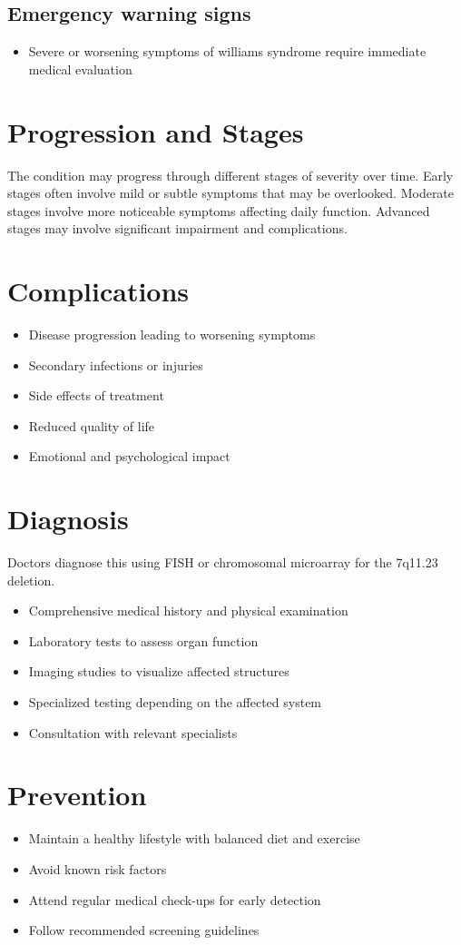 \subsection{Emergency warning signs}
\begin{itemize}[noitemsep]
  \item Severe or worsening symptoms of williams syndrome require immediate medical evaluation
\end{itemize}
\section{Progression and Stages}
The condition may progress through different stages of severity over time. Early stages often involve mild or subtle symptoms that may be overlooked. Moderate stages involve more noticeable symptoms affecting daily function. Advanced stages may involve significant impairment and complications.
\section{Complications}
\begin{itemize}[noitemsep]
  \item Disease progression leading to worsening symptoms
  \item Secondary infections or injuries
  \item Side effects of treatment
  \item Reduced quality of life
  \item Emotional and psychological impact
\end{itemize}
\section{Diagnosis}
Doctors diagnose this using FISH or chromosomal microarray for the 7q11.23 deletion.

\begin{itemize}[noitemsep]
  \item Comprehensive medical history and physical examination
  \item Laboratory tests to assess organ function
  \item Imaging studies to visualize affected structures
  \item Specialized testing depending on the affected system
  \item Consultation with relevant specialists
\end{itemize}
\section{Prevention}
\begin{itemize}[noitemsep]
  \item Maintain a healthy lifestyle with balanced diet and exercise
  \item Avoid known risk factors
  \item Attend regular medical check-ups for early detection
  \item Follow recommended screening guidelines
\end{itemize}
